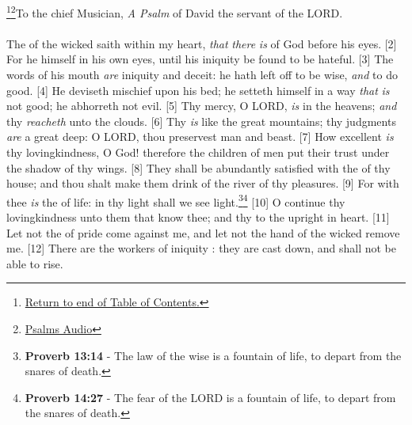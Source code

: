 \footnote{\textcolor[cmyk]{0.99998,1,0,0}{\hyperlink{TOC}{Return to end of Table of Contents.}}}\footnote{\href{https://audiobible.com/bible}{\textcolor[cmyk]{0.99998,1,0,0}{Psalms Audio}}}\textcolor[cmyk]{0.99998,1,0,0}{To the chief Musician, \emph{A Psalm} of David the servant of the LORD.}\\
\\
\textcolor[cmyk]{0.99998,1,0,0}{The  of the wicked saith within my heart, \emph{that} \emph{there} \emph{is}  of God before his eyes.}
[2] \textcolor[cmyk]{0.99998,1,0,0}{For he  himself in his own eyes, until his iniquity be found to be hateful.}
[3] \textcolor[cmyk]{0.99998,1,0,0}{The words of his mouth \emph{are} iniquity and deceit: he hath left off to be wise, \emph{and} to do good.}
[4] \textcolor[cmyk]{0.99998,1,0,0}{He deviseth mischief upon his bed; he setteth himself in a way \emph{that} \emph{is} not good; he abhorreth not evil.}
[5] \textcolor[cmyk]{0.99998,1,0,0}{Thy mercy, O LORD, \emph{is} in the heavens; \emph{and} thy  \emph{reacheth} unto the clouds.}
[6] \textcolor[cmyk]{0.99998,1,0,0}{Thy  \emph{is} like the great mountains; thy judgments \emph{are} a great deep: O LORD, thou preservest man and beast.}
[7] \textcolor[cmyk]{0.99998,1,0,0}{How excellent \emph{is} thy lovingkindness, O God! therefore the children of men put their trust under the shadow of thy wings.}
[8] \textcolor[cmyk]{0.99998,1,0,0}{They shall be abundantly satisfied with the  of thy house; and thou shalt make them drink of the river of thy pleasures.}
[9] \textcolor[cmyk]{0.99998,1,0,0}{For with thee \emph{is} the  of life: in thy light shall we see light.}\footnote{\textbf{Proverb 13:14} - The law of the wise is a fountain of life, to depart from the snares of death.}\footnote{\textbf{Proverb 14:27} - The fear of the LORD is a fountain of life, to depart from the snares of death.}
[10] \textcolor[cmyk]{0.99998,1,0,0}{O continue thy lovingkindness unto them that know thee; and thy  to the upright in heart.}
[11] \textcolor[cmyk]{0.99998,1,0,0}{Let not the  of pride come against me, and let not the hand of the wicked remove me.}
[12] \textcolor[cmyk]{0.99998,1,0,0}{There are the workers of iniquity : they are cast down, and shall not be able to rise.}



